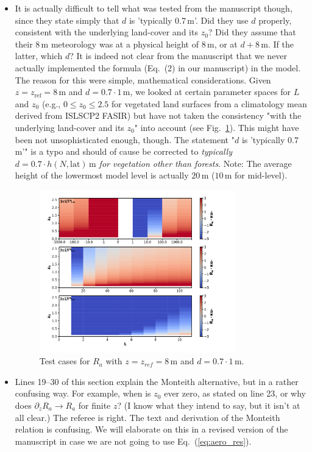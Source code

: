 \documentclass{scrartcl}
\begin{document}
\begin{itemize}
\begin{itemize}
\item {\color{blue} It is actually difficult to tell what
was tested from the manuscript though, since they state simply that $d$ is ’typically 0.7\,m’.
Did they use $d$ properly, consistent with the underlying land-cover and its $z_0$? Did
they assume that their 8\,m meteorology was at a physical height of 8\,m, or at $d + 8\,\mathrm{m}$.
If the latter, which $d$?}
  It is indeed not clear from the manuscript that we never actually implemented the formula (Eq.~(2) in our manuscript) in the model. The reason for this were simple, mathematical considerations. Given $z = z_\mathrm{ref} = 8\,\mathrm{m}$ and $d = 0.7\cdot 1\,\mathrm{m}$, we looked at certain parameter spaces for $L$ and $z_0$ (e.g., $0 \le z_0 \le 2.5$ for vegetated land surfaces from a climatology mean derived from ISLSCP2 FASIR) but have not taken the consistency "with the underlying land-cover and its $z_0$" into account (see Fig.~\ref{fig:test_ra}). This might have been not unsophisticated enough, though. The statement "$d$ is ’typically 0.7\,m’" is a typo and should of cause be corrected to \emph{typically $d = 0.7\cdot h(N,\mathrm{lat})\,\mathrm{m}$ for vegetation other than forests}. Note: The average height of the lowermost model level is actually $20\,\mathrm{m}$ ($10\,\mathrm{m}$ for mid-level).
  
  \begin{figure}
    \centering
    \includegraphics[width=0.8\textwidth]{test_Ra_wrong_form.pdf}
    \caption{Test cases for $R_a$ with $z = z_{ref} = 8\,\mathrm{m}$ and $d = 0.7\cdot 1\,\mathrm{m}$.}
    \label{fig:test_ra}
  \end{figure} 

\item {\color{blue} Lines 19--30 of this section explain the Monteith alternative, but in a rather confusing
way. For example, when is $z_0$ ever zero, as stated on line 23, or why does $\partial_z R_a \rightarrow R_a $
for finite $z$? (I know what they intend to say, but it isn’t at all clear.)}
  The referee is right. The text and derivation of the Monteith relation is confusing. We will elaborate on this in a revised version of the manuscript in case we are not going to use Eq.~(\ref{eq:aero_res}).


\end{itemize}
\end{itemize}
\end{document}
